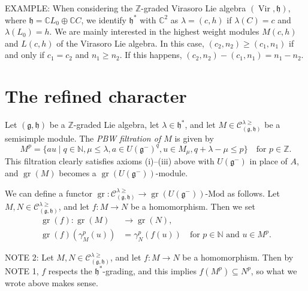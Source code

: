 \documentclass[a4paper, 12pt, reqno]{amsart}
\DeclareMathOperator{\Vir}{Vir}
\DeclareMathOperator{\gr}{gr}
\begin{document}
EXAMPLE: When considering the $\mathbb{Z}$-graded Virasoro Lie algebra $(\Vir, \mathfrak{h})$, where $\mathfrak{h} = \mathbb{C}L_0 \oplus \mathbb{C}C$, we identify $\mathfrak{h}^*$ with $\mathbb{C}^2$ as $\lambda = (c, h)$ if $\lambda(C) = c$ and $\lambda(L_0) = h$.
We are mainly interested in the highest weight modules $M(c, h)$ and $L(c, h)$ of the Virasoro Lie algebra.
In this case, $(c_2, n_2) \ge (c_1, n_1)$ if and only if $c_1 = c_2$ and $n_1 \ge n_2$.
If this happens, $(c_2, n_2) - (c_1, n_1) = n_1 - n_2$.

\section{The refined character}
\label{sec:refined-character}

Let $(\mathfrak{g}, \mathfrak{h})$ be a $\mathbb{Z}$-graded Lie algebra, let $\lambda \in \mathfrak{h}^*$, and let $M \in \mathcal{C}^{\lambda \ge}_{(\mathfrak{g}, \mathfrak{h})}$ be a semisimple module.
The \emph{PBW filtration of $M$} is given by
\begin{equation*}
  M^p = \{au \mid q \in \mathbb{N}, \mu \le \lambda, a \in U(\mathfrak{g}^-)^q, u \in M_{\mu}, q + \lambda - \mu \le p\} \quad \text{for $p \in \mathbb{Z}$}.
\end{equation*}
This filtration clearly satisfies axioms (i)--(iii) above with $U(\mathfrak{g}^-)$ in place of $A$, and $\gr(M)$ becomes a $\gr(U(\mathfrak{g^-}))$-module.

We can define a functor $\gr: \mathcal{C}^{\lambda \ge}_{(\mathfrak{g}, \mathfrak{h})} \to \gr(U(\mathfrak{g}^-))\text{-Mod}$ as follows.
Let $M, N \in \mathcal{C}^{\lambda \ge}_{(\mathfrak{g}, \mathfrak{h})}$, and let $f: M \to N$ be a homomorphism.
Then we set
\begin{align*}
  \gr(f): \gr(M) &\to \gr(N), \\
  \gr(f)(\gamma_M^p(u)) &= \gamma_N^p(f(u)) \quad \text{for $p \in \mathbb{N}$ and $u \in M^p$}.
\end{align*}

NOTE 2: Let $M, N \in \mathcal{C}^{\lambda \ge}_{(\mathfrak{g}, \mathfrak{h})}$, and let $f: M \to N$ be a homomorphism.
Then by NOTE 1, $f$ respects the $\mathfrak{h}^*$-grading, and this implies $f(M^p) \subseteq N^p$, so what we wrote above makes sense.
\end{document}

